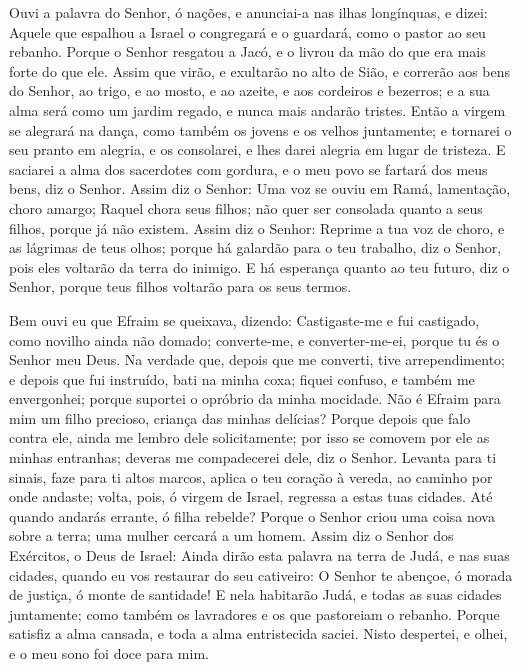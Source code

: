 Ouvi a palavra do Senhor, ó nações, e anunciai-a nas ilhas
longínquas, e dizei: Aquele que espalhou a Israel o congregará e o
guardará, como o pastor ao seu rebanho. Porque o Senhor
resgatou a Jacó, e o livrou da mão do que era mais forte do que ele.
Assim que virão, e exultarão no alto de Sião, e correrão aos
bens do Senhor, ao trigo, e ao mosto, e ao azeite, e aos cordeiros e
bezerros; e a sua alma será como um jardim regado, e nunca mais
andarão tristes. Então a virgem se alegrará na dança, como
também os jovens e os velhos juntamente; e tornarei o seu pranto em
alegria, e os consolarei, e lhes darei alegria em lugar de tristeza.
E saciarei a alma dos sacerdotes com gordura, e o meu povo se
fartará dos meus bens, diz o Senhor. Assim diz o Senhor: Uma
voz se ouviu em Ramá, lamentação, choro amargo; Raquel chora seus
filhos; não quer ser consolada quanto a seus filhos, porque já não
existem. Assim diz o Senhor: Reprime a tua voz de choro, e as
lágrimas de teus olhos; porque há galardão para o teu trabalho, diz
o Senhor, pois eles voltarão da terra do inimigo. E há
esperança quanto ao teu futuro, diz o Senhor, porque teus filhos
voltarão para os seus termos.

Bem ouvi eu que Efraim se queixava, dizendo: Castigaste-me e fui
castigado, como novilho ainda não domado; converte-me, e
converter-me-ei, porque tu és o Senhor meu Deus. Na verdade
que, depois que me converti, tive arrependimento; e depois que fui
instruído, bati na minha coxa; fiquei confuso, e também me
envergonhei; porque suportei o opróbrio da minha mocidade.
Não é Efraim para mim um filho precioso, criança das minhas
delícias? Porque depois que falo contra ele, ainda me lembro dele
solicitamente; por isso se comovem por ele as minhas entranhas;
deveras me compadecerei dele, diz o Senhor. Levanta para ti
sinais, faze para ti altos marcos, aplica o teu coração à vereda, ao
caminho por onde andaste; volta, pois, ó virgem de Israel, regressa
a estas tuas cidades. Até quando andarás errante, ó filha
rebelde? Porque o Senhor criou uma coisa nova sobre a terra; uma
mulher cercará a um homem. Assim diz o Senhor dos Exércitos,
o Deus de Israel: Ainda dirão esta palavra na terra de Judá, e nas
suas cidades, quando eu vos restaurar do seu cativeiro: O Senhor te
abençoe, ó morada de justiça, ó monte de santidade! E nela
habitarão Judá, e todas as suas cidades juntamente; como também os
lavradores e os que pastoreiam o rebanho. Porque satisfiz a
alma cansada, e toda a alma entristecida saciei. Nisto
despertei, e olhei, e o meu sono foi doce para mim.

